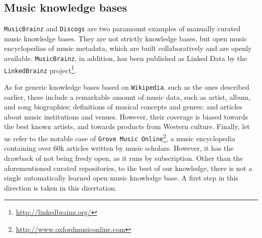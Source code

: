 
\subsection{Music knowledge bases}\label{sec:SOA:nlu:mkbs}

\texttt{MusicBrainz} and \texttt{Discogs} are two paramount examples of manually curated music knowledge bases. They are not strictly knowledge bases, but open music encyclopedias of music metadata, which are built collaboratively and are openly available. \texttt{MusicBrainz}, in addition, has been published as Linked Data by the \texttt{LinkedBrainz} project\footnote{\url{http://linkedbrainz.org/}}.

As for generic knowledge bases based on \texttt{Wikipedia}, such as the ones described earlier, these include a remarkable amount of music data, such as artist, album, and song biographies; definitions of musical concepts and genres; and articles about music institutions and venues. However, their coverage is biased towards the best known artists, and towards products from Western culture. Finally, let us refer to the notable case of \texttt{Grove Music Online}\footnote{\url{http://www.oxfordmusiconline.com}}, a music encyclopedia containing over 60k articles written by music scholars. However, it has the drawback of not being freely open, as it runs by subscription.
Other than the aforementioned curated repositories, to the best of our knowledge, there is not a single automatically learned open music knowledge base. A first step in this direction is taken in this disertation.

